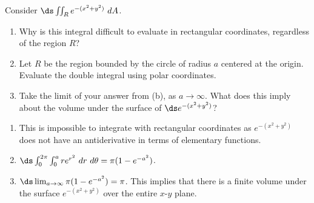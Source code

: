 {Consider $\ds \iint_R e^{-(x^2+y^2)}\ dA$.
	\begin{enumerate}
		\item Why is this integral difficult to evaluate in rectangular coordinates, regardless of the region $R$?
		\item		Let $R$ be the region bounded by the circle of radius $a$ centered at the origin. Evaluate the double integral using polar coordinates.
		\item		Take the limit of your answer from (b), as $a\to\infty$. What does this imply about the volume under the surface of $\ds e^{-(x^2+y^2)}$?
	\end{enumerate}
}
{\begin{enumerate}
	\item This is impossible to integrate with rectangular coordinates as $e^{-(x^2+y^2)}$ does not have an antiderivative in terms of elementary functions.
	\item	$\ds \int_0^{2\pi}\int_0^a re^{r^2}\ dr\ d\theta = \pi(1-e^{-a^2})$.
	\item		$\ds \lim_{a\to\infty} \pi(1-e^{-a^2})=\pi$. This implies that there is a finite volume under the surface $e^{-(x^2+y^2)}$ over the entire $x$-$y$ plane.
\end{enumerate}
}